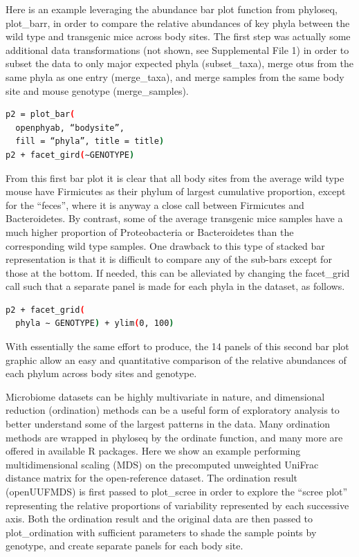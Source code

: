 Here is an example leveraging the abundance bar plot function from phyloseq, plot\_barr,
in order to compare the relative abundances of key phyla between the wild type and
transgenic mice across body sites. The first step was actually some additional data
transformations (not shown, see Supplemental File 1) in order to subset the data to
only major expected phyla (subset\_taxa), merge \gls{otu}s from the same phyla as one entry
(merge\_taxa), and merge samples from the same body site and mouse genotype (merge\_samples).

\begin{lstlisting}[language=bash]
p2 = plot_bar(
  openphyab, “bodysite”,
  fill = “phyla”, title = title)
p2 + facet_gird(∼GENOTYPE)
\end{lstlisting}

From this first bar plot it is clear that all body sites from the average wild type
mouse have Firmicutes as their phylum of largest cumulative proportion, except for the
“feces”, where it is anyway a close call between Firmicutes and Bacteroidetes. By contrast,
some of the average transgenic mice samples have a much higher proportion of Proteobacteria
or Bacteroidetes than the corresponding wild type samples. One drawback to this type of
stacked bar representation is that it is difficult to compare any of the sub-bars except
for those at the bottom. If needed, this can be alleviated by changing the facet\_grid call
such that a separate panel is made for each phyla in the dataset, as follows.

\begin{lstlisting}[language=bash]
p2 + facet_grid(
  phyla ∼ GENOTYPE) + ylim(0, 100)
\end{lstlisting}

With essentially the same effort to produce, the 14 panels of this second bar
plot graphic allow an easy and quantitative comparison of the relative abundances
of each phylum across body sites and genotype.

Microbiome datasets can be highly multivariate in nature, and dimensional reduction
(ordination) methods can be a useful form of exploratory analysis to better understand
some of the largest patterns in the data. Many ordination methods are wrapped in phyloseq
by the ordinate function, and many more are offered in available R packages. Here we
show an example performing multidimensional scaling (MDS) on the precomputed unweighted
UniFrac distance matrix for the open-reference dataset. The ordination result (openUUFMDS)
is first passed to plot\_scree in order to explore the “scree plot” representing the
relative proportions of variability represented by each successive axis. Both
the ordination result and the original data are then passed to plot\_ordination
with sufficient parameters to shade the sample points by genotype, and create
separate panels for each body site.

